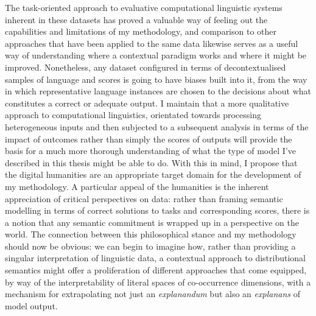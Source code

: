 The task-oriented approach to evaluative computational linguistic systems inherent in these datasets has proved a valuable way of feeling out the capabilities and limitations of my methodology, and comparison to other approaches that have been applied to the same data likewise serves as a useful way of understanding where a contextual paradigm works and where it might be improved.  Nonetheless, any dataset configured in terms of decontextualised samples of language and scores is going to have biases built into it, from the way in which representative language instances are chosen to the decisions about what constitutes a correct or adequate output.  I maintain that a more qualitative approach to computational linguistics, orientated towards processing heterogeneous inputs and then subjected to a subsequent analysis in terms of the impact of outcomes rather than simply the scores of outputs will provide the basis for a much more thorough understanding of what the type of model I've described in this thesis might be able to do.  With this in mind, I propose that the digital humanities are an appropriate target domain for the development of my methodology.  A particular appeal of the humanities is the inherent appreciation of critical perspectives on data: rather than framing semantic modelling in terms of correct solutions to tasks and corresponding scores, there is a notion that any semantic commitment is wrapped up in a perspective on the world.  The connection between this philosophical stance and my methodology should now be obvious: we can begin to imagine how, rather than providing a singular interpretation of linguistic data, a contextual approach to distributional semantics might offer a proliferation of different approaches that come equipped, by way of the interpretability of literal spaces of co-occurrence dimensions, with a mechanism for extrapolating not just an \emph{explanandum} but also an \emph{explanans} of model output.

